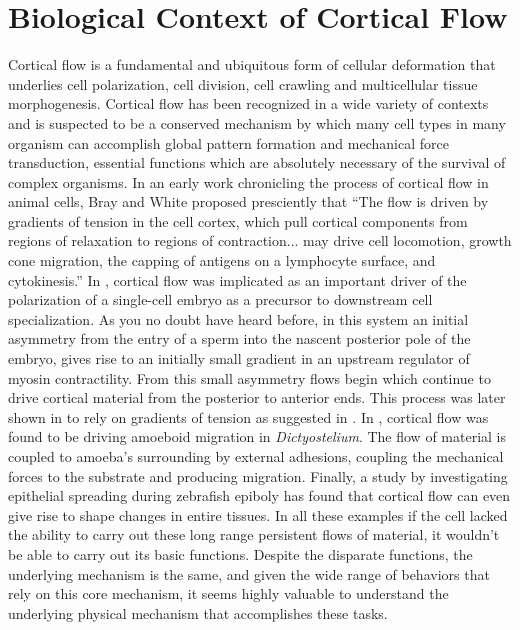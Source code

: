

\section{Biological Context of Cortical Flow}
Cortical flow is a fundamental and ubiquitous form of cellular deformation that underlies cell polarization, cell division, cell crawling and multicellular tissue morphogenesis\cite{cellmech_flows3,cellmech_flows2,Benink:2000aa,Wilson:2010aa,Rauzi2010,Munro2004413}. Cortical flow has been recognized in a wide variety of contexts and is suspected to be a conserved mechanism by which many cell types in many organism can accomplish global pattern formation and mechanical force transduction, essential functions which are absolutely necessary of the survival of complex organisms.  In an early work chronicling the process of cortical flow in animal cells\cite{cellmech_flows3}, Bray and White proposed presciently that ``The flow is driven by gradients of tension in the cell cortex, which pull cortical components from regions of relaxation to regions of contraction... may drive cell locomotion, growth cone migration, the capping of antigens on a lymphocyte surface, and cytokinesis.''  In \cite{Munro2004413}, cortical flow was implicated as an important driver of the polarization of a single-cell embryo as a precursor to downstream cell specialization.  As you no doubt have heard before, in this system an initial asymmetry from the entry of a sperm into the nascent posterior pole of the embryo, gives rise to an initially small gradient in an upstream regulator of myosin contractility. From this small asymmetry flows begin which continue to drive cortical material from the posterior to anterior ends.   This process was later shown in \cite{cellmech_flows} to rely on gradients of tension as suggested in \cite{cellmech_flows3}. In \cite{Yumura200}, cortical flow was found to be driving amoeboid migration in \textit{Dictyostelium}. The flow of material is coupled to amoeba's surrounding by external adhesions, coupling the mechanical forces to the substrate and producing migration. Finally, a study by \cite{Behrndt257} investigating epithelial spreading during zebrafish epiboly has found that cortical flow can even give rise to shape changes in entire tissues.  In all these examples if the cell lacked the ability to carry out these long range persistent flows of material, it wouldn't be able to carry out its basic functions.  Despite the disparate functions,  the underlying mechanism is the same, and given the wide range of behaviors that rely on this core mechanism, it seems highly valuable to understand the underlying physical mechanism that accomplishes these tasks.


